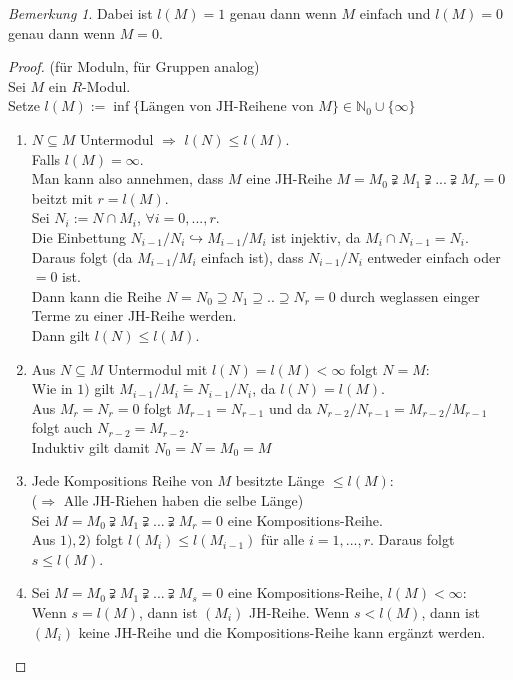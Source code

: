 \documentclass[10pt,a4paper]{article}
\newcommand{\N}{\ensuremath{\mathbb{N}}}
\newcommand{\isomorph}{\ensuremath{\tilde{=}}}
\theoremstyle{definition}
\theoremstyle{plain}
\theoremstyle{remark}
\newtheorem*{bem*}{Bemerkung}
\begin{document}
\begin{bem*}
	Dabei ist $l(M)=1$ genau dann wenn $M$ einfach und $l(M)=0$ genau dann wenn $M=0$.
\end{bem*}

\begin{proof}
	(für Moduln, für Gruppen analog)\\
	Sei $M$ ein $R$-Modul.\\
	Setze $l(M):=\inf\{\text{Längen von JH-Reihene von $M$}\}\in \N_0\cup\{\infty\}$
	\begin{enumerate}
		\item $N\subseteq M$ Untermodul $\Rightarrow$ $l(N)\leq l(M)$.\\
		Falls $l(M)=\infty$.\\
		Man kann also annehmen, dass $M$ eine JH-Reihe $M=M_0\supsetneqq M_1\supsetneqq...\supsetneqq M_r=0$ beitzt mit $r=l(M)$.\\
		Sei $N_i:=N\cap M_i$, $\forall i=0,...,r$.\\
		Die Einbettung $N_{i-1}/N_i\hookrightarrow M_{i-1}/M_i$ ist injektiv, da $M_i\cap N_{i-1}=N_i$.\\
		Daraus folgt (da $M_{i-1}/M_i$ einfach ist), dass $N_{i-1}/N_i$ entweder einfach oder $=0$ ist.\\
		Dann kann die Reihe $N=N_0\supseteq N_1\supseteq..\supseteq N_r=0$ durch weglassen einger Terme zu einer JH-Reihe werden.\\
		Dann gilt $l(N)\leq l(M)$.
		
		\item Aus $N\subseteq M$ Untermodul mit $l(N)=l(M)<\infty$ folgt $N=M$:\\
		Wie in $1)$ gilt $M_{i-1}/M_i\isomorph N_{i-1}/N_i$, da $l(N)=l(M)$.\\
		Aus $M_r=N_r=0$ folgt $M_{r-1}=N_{r-1}$ und da $N_{r-2}/N_{r-1}=M_{r-2}/M_{r-1}$ folgt auch $N_{r-2}=M_{r-2}$.\\
		Induktiv gilt damit $N_0=N=M_0=M$
		\item Jede Kompositions Reihe von $M$ besitzte Länge $\leq l(M)$:\\
		($\Rightarrow$ Alle JH-Riehen haben die selbe Länge)\\
		Sei $M=M_0\supsetneqq M_1\supsetneqq...\supsetneqq M_r=0$ eine Kompositions-Reihe.\\
		Aus $1),2)$ folgt $l(M_i)\leq l(M_{i-1})$ für alle $i=1,...,r$. Daraus folgt $s\leq l(M)$.
		
		\item Sei $M=M_0\supsetneqq M_1\supsetneqq...\supsetneqq M_s=0$ eine Kompositions-Reihe, $l(M)<\infty$:\\
		Wenn $s=l(M)$, dann ist $(M_i)$ JH-Reihe. Wenn $s<l(M)$, dann ist $(M_i)$ keine JH-Reihe und die Kompositions-Reihe kann ergänzt werden.
	\end{enumerate}
\end{proof}
\end{document}
